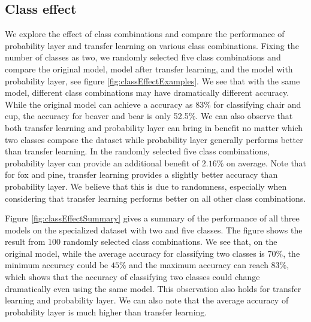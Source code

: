 \documentclass[pageno]{jpaper}
\begin{document}
\subsection{Class effect}
We explore the effect of class combinations and compare the performance of probability layer and transfer learning on various class combinations. Fixing the number of classes as two, we randomly selected five class combinations and compare the original model, model after transfer learning, and the model with probability layer, see figure \ref{fig:classEffectExamples}. We see that with the same model, different class combinations may have dramatically different accuracy. While the original model can achieve a accuracy as 83\% for classifying chair and cup, the accuracy for beaver and bear is only 52.5\%. We can also observe that both transfer learning and probability layer can bring in benefit no matter which two classes compose the dataset while probability layer generally performs better than transfer learning. In the randomly selected five class combinations, probability layer can provide an additional benefit of $2.16\%$ on average. Note that for fox and pine, transfer learning provides a slightly better accuracy than probability layer. We believe that this is due to randomness, especially when considering that transfer learning performs better on all other class combinations. 

Figure \ref{fig:classEffectSummary} gives a summary of the performance of all three models on the specialized dataset with two and five classes. The figure shows the result from $100$ randomly selected class combinations. We see that, on the original model, while the average accuracy for classifying two classes is $70\%$, the minimum accuracy could be $45\%$ and the maximum accuracy can reach $83\%$, which shows that the accuracy of classifying two classes could change dramatically even using the same model. This observation also holds for transfer learning and probability layer. We can also note that the average accuracy of probability layer is much higher than transfer learning. 
\end{document}
